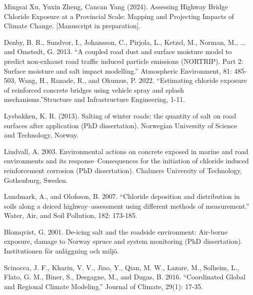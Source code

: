 \documentclass[12pt]{article}
\newcounter{refnum} %
\begin{document}
\begin{enumerate}[label={[\arabic*]}]
\item {} \label{ref7}
Mingsai Xu, Yuxin Zheng, Cancan Yang (2024). Assessing Highway Bridge Chloride Exposure at a Provincial Scale: Mapping and Projecting Impacts of Climate Change.  [Manuscript in preparation].

\item {} \label{ref8}
Denby, B. R., Sundvor, I., Johansson, C., Pirjola, L., Ketzel, M., Norman, M., ... and Omstedt, G. 2013. “A coupled road dust and surface moisture model to predict non-exhaust road traffic induced particle emissions (NORTRIP). Part 2: Surface moisture and salt impact modelling.” Atmospheric Environment, 81: 485-503, Wang, H., Ranade, R., and Okumus, P. 2022. “Estimating chloride exposure of reinforced concrete bridges using vehicle spray and splash mechanisms.”Structure and Infrastructure Engineering, 1-11. 

\item {} \label{ref9}
Lysbakken, K. R. (2013). Salting of winter roads: the quantity of salt on road surfaces after application (PhD dissertation). Norwegian University of Science and Technology, Norway.

\item {} \label{ref10}
Lindvall, A. 2003. Environmental actions on concrete exposed in marine and road environments and its response–Consequences for the initiation of chloride induced reinforcement corrosion (PhD dissertation). Chalmers University of Technology, Gothenburg, Sweden.

\item {} \label{ref11}
Lundmark, A., and Olofsson, B. 2007. “Chloride deposition and distribution in soils along a deiced highway–assessment using different methods of measurement.” Water, Air, and Soil Pollution, 182: 173-185.

\item {} \label{ref12}
Blomqvist, G. 2001. De-icing salt and the roadside environment: Air-borne exposure, damage to Norway spruce and system monitoring (PhD dissertation). Institutionen för anläggning och miljö.

\item {} \label{ref13}
Scinocca, J. F., Kharin, V. V., Jiao, Y., Qian, M. W., Lazare, M., Solheim, L., Flato, G. M., Biner,  S., Desgagne, M., and Dugas, B. 2016. “Coordinated Global and Regional Climate Modeling.” Journal of Climate, 29(1): 17-35.


\end{enumerate}
\end{document}

